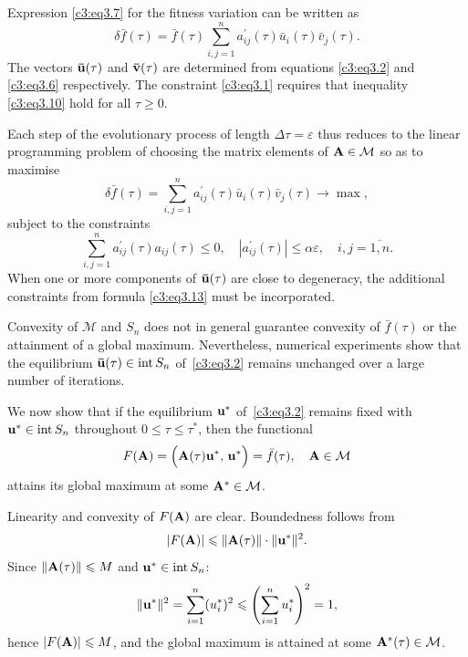 \documentclass[12pt]{report}
\newcommand{\inside}{\mathrm{int}\,}
\theoremstyle{definition}
\theoremstyle{remark}
\begin{document}
Expression \eqref{c3:eq3.7} for the fitness variation can be written as
$$
	\delta\bar{f}(\tau) = \bar{f}(\tau)\sum\limits_{i, j = 1}^{n}a_{ij}^{'}(\tau)\bar{u}_{i}(\tau)\bar{v}_{j}(\tau).
$$
The vectors ${\bf \bar{u}}(\tau)$ and ${\bf \bar{v}}(\tau)$ are determined from equations \eqref{c3:eq3.2} and \eqref{c3:eq3.6} respectively. The constraint \eqref{c3:eq3.1} requires that inequality \eqref{c3:eq3.10} hold for all $\tau \geqslant 0$.

Each step of the evolutionary process of length $\Delta\tau = \varepsilon$ thus reduces to the linear programming problem of choosing the matrix elements of ${\bf A} \in \mathcal{M}$ so as to maximise
$$
	\delta\bar{f}(\tau) = \sum\limits_{i, j = 1}^{n}a_{ij}^{'}(\tau)\bar{u}_{i}(\tau)\bar{v}_{j}(\tau) \to \max,
$$
subject to the constraints
$$
	\sum\limits_{i, j = 1}^{n}a_{ij}^{'}(\tau)a_{ij}(\tau) \leqslant 0, \quad |a_{ij}^{'}(\tau)| \leqslant \alpha\varepsilon, \quad i, j = \overline{1, n}.
$$
When one or more components of ${\bf \bar{u}}(\tau)$ are close to degeneracy, the additional constraints from formula \eqref{c3:eq3.13} must be incorporated.

Convexity of $\mathcal{M}$ and $S_n$ does not in general guarantee convexity of
$\bar{f}(\tau)$ or the attainment of a global maximum. Nevertheless, numerical
experiments show that the equilibrium ${\bf \bar{u}}(\tau) \in \inside S_n$
of~\eqref{c3:eq3.2} remains unchanged over a large number of iterations.

We now show that if the equilibrium ${\bf u}^*$ of~\eqref{c3:eq3.2} remains fixed
with ${\bf u}^* \in \inside S_n$ throughout $0 \leqslant \tau \leqslant \tau^*$,
then the functional
\begin{equation*}
	F({\bf A}) = \Big({\bf A}(\tau){\bf u}^*,\, {\bf u}^*\Big) = \bar{f}(\tau),
	\quad {\bf A} \in \mathcal{M}
\end{equation*}
attains its global maximum at some ${\bf A}^* \in \mathcal{M}$.

Linearity and convexity of $F({\bf A})$ are clear. Boundedness follows from
\begin{equation*}
	|F({\bf A})| \leqslant \|{\bf A}(\tau)\| \cdot \|{\bf u}^*\|^2.
\end{equation*}
Since $\|{\bf A}(\tau)\| \leqslant M$ and ${\bf u}^* \in \inside S_n$:
\begin{equation*}
	\|{\bf u}^*\|^2 = \sum\limits_{i=1}^n (u_i^*)^2
	\leqslant \left(\sum\limits_{i=1}^n u_i^*\right)^2 = 1,
\end{equation*}
hence $|F({\bf A})| \leqslant M$, and the global maximum is attained at some
${\bf A}^*(\tau) \in \mathcal{M}$.
\end{document}
